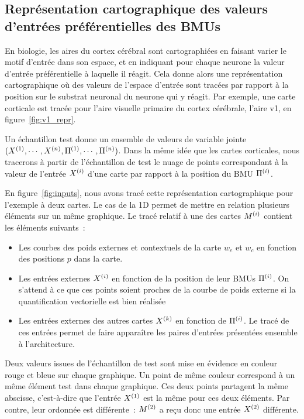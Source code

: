 \documentclass[../main]{subfiles}
\begin{document}
\subsection{Représentation cartographique des valeurs d'entrées préférentielles des BMUs}

En biologie, les aires du cortex cérébral sont cartographiées en faisant varier le motif d'entrée dans son espace, et en indiquant pour chaque neurone la valeur d'entrée préférentielle à laquelle il réagit. Cela donne alors une représentation cartographique où des valeurs de l'espace d'entrée sont tracées par rapport à la position sur le substrat neuronal du neurone qui y réagit.
Par exemple, une carte corticale est tracée pour l'aire visuelle primaire du cortex cérébrale, l'aire v1, en figure~\ref{fig:v1_repr}.

Un échantillon test donne un ensemble de valeurs de variable jointe $(X^{({1})}, \cdots, X^{({n})}, \Pi^{({1})},\cdots, \Pi^{({n})})$. Dans la même idée que les cartes corticales, nous tracerons à partir de l'échantillon de test le nuage de points correspondant à la valeur de l'entrée $X^{({i})}$ d'une carte par rapport à la position du BMU $\Pi^{({i})}$.

En figure~\ref{fig:inputs}, nous avons tracé cette représentation cartographique pour l'exemple à deux cartes. Le cas de la 1D permet de mettre en relation plusieurs éléments sur un même graphique.
Le tracé relatif à une des cartes $M^{({i})}$ contient les éléments suivants~:
\begin{itemize}
    \item Les courbes des poids externes et contextuels de la carte $w_e$ et $w_c$ en fonction des positions $p$ dans la carte.
    \item Les entrées externes $X^{({i})}$ en fonction de la position de leur BMUs $\Pi^{({i})}$. On s'attend à ce que ces points soient proches de la courbe de poids externe si la quantification vectorielle est bien réalisée
    \item Les entrées externes des autres cartes $X^{({k})}$ en fonction de $\Pi^{({i})}$. Le tracé de ces entrées permet de faire apparaître les paires d'entrées présentées ensemble à l'architecture.
\end{itemize} 

Deux valeurs issues de l'échantillon de test sont mise en évidence en couleur rouge et bleue sur chaque graphique. Un point de même couleur correspond à un même élément test dans chaque graphique. Ces deux points partagent la même abscisse, c'est-à-dire que l'entrée $X^{({1})}$ est la même pour ces deux éléments. Par contre, leur ordonnée est différente~: $M^{({2})}$ a reçu donc une entrée $X^{({2})}$ différente.
\end{document}
